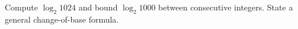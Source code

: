 Compute $\log_2 1024$ and bound $\log_2 1000$ between consecutive integers. State a general change-of-base formula.

